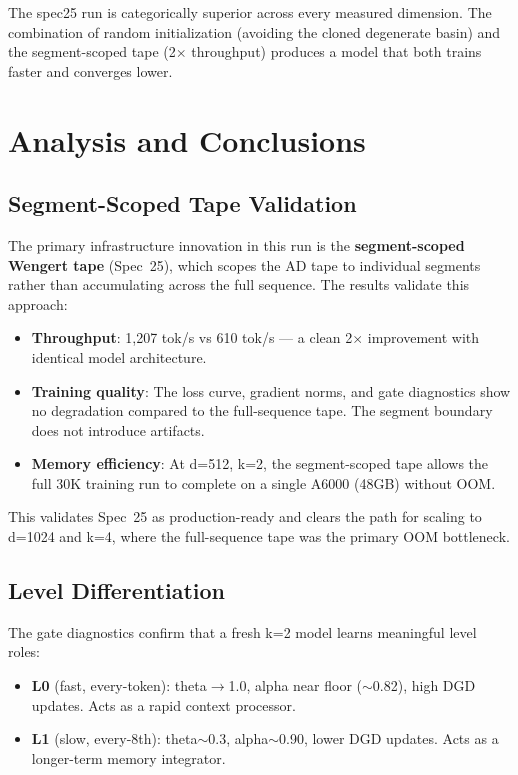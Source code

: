 \documentclass[11pt,a4paper]{article}
\begin{document}
The spec25 run is categorically superior across every measured dimension. The combination of random initialization (avoiding the cloned degenerate basin) and the segment-scoped tape (2$\times$ throughput) produces a model that both trains faster and converges lower.

\section{Analysis and Conclusions}

\subsection{Segment-Scoped Tape Validation}

The primary infrastructure innovation in this run is the \textbf{segment-scoped Wengert tape} (Spec~25), which scopes the AD tape to individual segments rather than accumulating across the full sequence. The results validate this approach:

\begin{itemize}
    \item \textbf{Throughput}: 1,207 tok/s vs 610 tok/s --- a clean 2$\times$ improvement with identical model architecture.
    \item \textbf{Training quality}: The loss curve, gradient norms, and gate diagnostics show no degradation compared to the full-sequence tape. The segment boundary does not introduce artifacts.
    \item \textbf{Memory efficiency}: At d=512, k=2, the segment-scoped tape allows the full 30K training run to complete on a single A6000 (48GB) without OOM.
\end{itemize}

This validates Spec~25 as production-ready and clears the path for scaling to d=1024 and k=4, where the full-sequence tape was the primary OOM bottleneck.

\subsection{Level Differentiation}

The gate diagnostics confirm that a fresh k=2 model learns meaningful level roles:
\begin{itemize}
    \item \textbf{L0} (fast, every-token): theta$\to$1.0, alpha near floor ($\sim$0.82), high DGD updates. Acts as a rapid context processor.
    \item \textbf{L1} (slow, every-8th): theta$\sim$0.3, alpha$\sim$0.90, lower DGD updates. Acts as a longer-term memory integrator.
\end{itemize}
\end{document}
